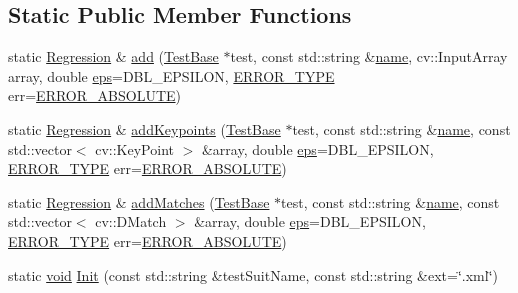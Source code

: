 \subsection*{Static Public Member Functions}
\begin{DoxyCompactItemize}
\item 
static \hyperlink{classperf_1_1Regression}{Regression} \& \hyperlink{classperf_1_1Regression_ac1319e939b68d59c61083584cec3611c}{add} (\hyperlink{classperf_1_1TestBase}{Test\-Base} $\ast$test, const std\-::string \&\hyperlink{core__c_8h_add928d8eb85ea33a25a67db3406d4887}{name}, cv\-::\-Input\-Array array, double \hyperlink{imgproc__c_8h_aabece9d4af1ab09d2f85ade473757e32}{eps}=D\-B\-L\-\_\-\-E\-P\-S\-I\-L\-O\-N, \hyperlink{namespaceperf_afd1ef30dd7868637f168926100ed2ba8}{E\-R\-R\-O\-R\-\_\-\-T\-Y\-P\-E} err=\hyperlink{namespaceperf_afd1ef30dd7868637f168926100ed2ba8a1f890b566341b120aa632095d9a8259f}{E\-R\-R\-O\-R\-\_\-\-A\-B\-S\-O\-L\-U\-T\-E})
\item 
static \hyperlink{classperf_1_1Regression}{Regression} \& \hyperlink{classperf_1_1Regression_afdc2eaa5169bd86bb826ad5758b9359b}{add\-Keypoints} (\hyperlink{classperf_1_1TestBase}{Test\-Base} $\ast$test, const std\-::string \&\hyperlink{core__c_8h_add928d8eb85ea33a25a67db3406d4887}{name}, const std\-::vector$<$ cv\-::\-Key\-Point $>$ \&array, double \hyperlink{imgproc__c_8h_aabece9d4af1ab09d2f85ade473757e32}{eps}=D\-B\-L\-\_\-\-E\-P\-S\-I\-L\-O\-N, \hyperlink{namespaceperf_afd1ef30dd7868637f168926100ed2ba8}{E\-R\-R\-O\-R\-\_\-\-T\-Y\-P\-E} err=\hyperlink{namespaceperf_afd1ef30dd7868637f168926100ed2ba8a1f890b566341b120aa632095d9a8259f}{E\-R\-R\-O\-R\-\_\-\-A\-B\-S\-O\-L\-U\-T\-E})
\item 
static \hyperlink{classperf_1_1Regression}{Regression} \& \hyperlink{classperf_1_1Regression_a93cd18c06bc63569dc9e3e98356a2db9}{add\-Matches} (\hyperlink{classperf_1_1TestBase}{Test\-Base} $\ast$test, const std\-::string \&\hyperlink{core__c_8h_add928d8eb85ea33a25a67db3406d4887}{name}, const std\-::vector$<$ cv\-::\-D\-Match $>$ \&array, double \hyperlink{imgproc__c_8h_aabece9d4af1ab09d2f85ade473757e32}{eps}=D\-B\-L\-\_\-\-E\-P\-S\-I\-L\-O\-N, \hyperlink{namespaceperf_afd1ef30dd7868637f168926100ed2ba8}{E\-R\-R\-O\-R\-\_\-\-T\-Y\-P\-E} err=\hyperlink{namespaceperf_afd1ef30dd7868637f168926100ed2ba8a1f890b566341b120aa632095d9a8259f}{E\-R\-R\-O\-R\-\_\-\-A\-B\-S\-O\-L\-U\-T\-E})
\item 
static \hyperlink{legacy_8hpp_a8bb47f092d473522721002c86c13b94e}{void} \hyperlink{classperf_1_1Regression_a34d86f52b801bbbfc19bf83bbed267e8}{Init} (const std\-::string \&test\-Suit\-Name, const std\-::string \&ext=\char`\"{}.xml\char`\"{})
\end{DoxyCompactItemize}


